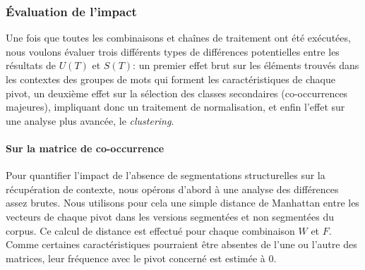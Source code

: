 \subsubsection{Évaluation de l'impact}

Une fois que toutes les combinaisons et chaînes de traitement ont été exécutées, nous voulons évaluer trois différents types de différences potentielles entre les résultats de $U(T)$ et $S(T)$: un premier effet brut sur les éléments trouvés dans les contextes des groupes de mots qui forment les caractéristiques de chaque pivot, un deuxième effet sur la sélection des classes secondaires (co-occurrences majeures), impliquant donc un traitement de normalisation, et enfin l'effet sur une analyse plus avancée, le \textit{clustering}.

\paragraph{Sur la matrice de co-occurrence}
\label{chap1:noise:par:manhattan}

Pour quantifier l'impact de l'absence de segmentations structurelles sur la récupération de contexte, nous opérons d'abord à une analyse des différences assez brutes. Nous utilisons pour cela une simple distance de Manhattan entre les vecteurs de chaque pivot dans les versions segmentées et non segmentées du corpus. Ce calcul de distance est effectué pour chaque combinaison $W$ et $F$. Comme certaines caractéristiques pourraient être absentes de l'une ou l'autre des matrices, leur fréquence avec le pivot concerné est estimée à 0.


